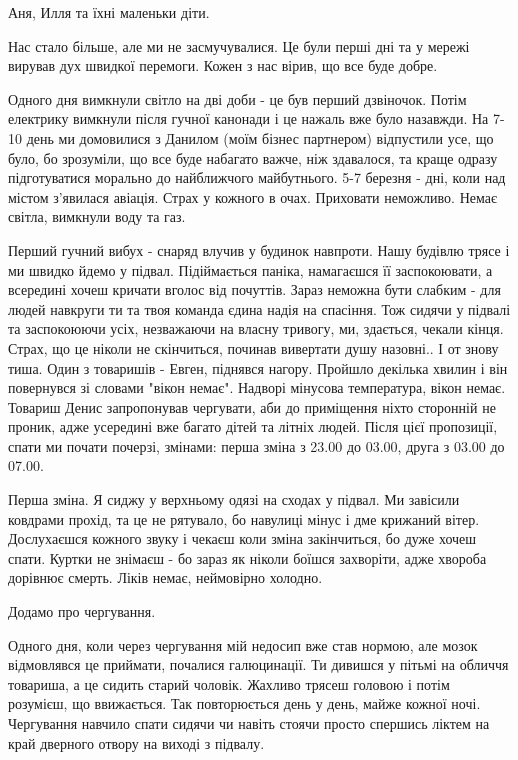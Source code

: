 Аня, Илля та їхні маленьки діти. 

Нас стало більше, але ми не засмучувалися. Це були перші дні та у мережі
вирував дух швидкої перемоги. Кожен з нас вірив, що все буде добре. 

Одного дня вимкнули світло на дві доби - це був перший дзвіночок. Потім
електрику вимкнули після гучної канонади і це нажаль вже було назавжди. На 7-10
день ми домовилися з Данилом (моїм бізнес партнером) відпустили усе, що було,
бо зрозуміли, що все буде набагато важче, ніж здавалося, та краще одразу
підготуватися морально до найближчого майбутнього. 5-7 березня - дні, коли над
містом з'явилася авіація. Страх у кожного в очах. Приховати неможливо. Немає
світла, вимкнули воду та газ. 

Перший гучний вибух - снаряд влучив у будинок навпроти. Нашу будівлю трясе і ми
швидко йдемо у підвал. Підіймається паніка, намагаєшся її заспокоювати, а
всередині хочеш кричати вголос від почуттів. Зараз неможна бути слабким - для
людей навкруги ти та твоя команда єдина надія на спасіння. Тож сидячи у підвалі
та заспокоюючи усіх, незважаючи на власну тривогу, ми, здається, чекали кінця.
Страх, що це ніколи не скінчиться, починав вивертати душу назовні.. І от знову
тиша. Один з товаришів - Евген, піднявся нагору. Пройшло декілька хвилин і він
повернувся зі словами "вікон немає". Надворі мінусова температура, вікон немає.
Товариш Денис запропонував чергувати, аби до приміщення ніхто сторонній не
проник, адже усередині вже багато дітей та літніх людей. Після цієї пропозиції,
спати ми почати почерзі, змінами: перша зміна з 23.00 до 03.00, друга з 03.00
до 07.00. 

Перша зміна. Я сиджу у верхньому одязі на сходах у підвал. Ми завісили ковдрами
прохід, та це не рятувало, бо навулиці мінус і дме крижаний вітер. Дослухаєшся
кожного звуку і чекаєш коли зміна закінчиться, бо дуже хочеш спати. Куртки не
знімаєш - бо зараз як ніколи боїшся захворіти, адже хвороба дорівнює смерть.
Ліків немає, неймовірно холодно. 

Додамо про чергування. 

Одного дня, коли через чергування мій недосип вже став нормою, але мозок
відмовлявся це приймати, почалися галюцинації. Ти дивишся у пітьмі на обличчя
товариша, а це сидить старий чоловік. Жахливо трясеш головою і потім розумієш,
що ввижається. Так повторюється день у день, майже кожної ночі. Чергування
навчило спати сидячи чи навіть стоячи просто спершись ліктем на край дверного
отвору на виході з підвалу. 

